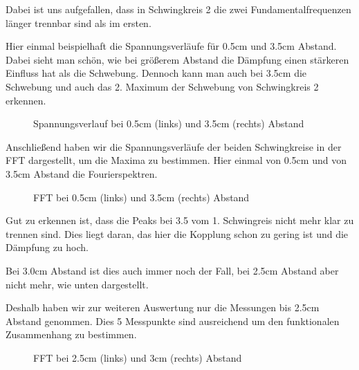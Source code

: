 \documentclass[twoside]{protokoll}
\begin{document}
Dabei ist uns aufgefallen, dass in Schwingkreis 2 die zwei Fundamentalfrequenzen länger trennbar sind als im ersten.  

Hier einmal beispielhaft die Spannungsverläufe für 0.5cm und 3.5cm Abstand.
Dabei sieht man schön, wie bei größerem Abstand die Dämpfung einen stärkeren Einfluss hat als die Schwebung.
Dennoch kann man auch bei 3.5cm die Schwebung und auch das 2. Maximum der Schwebung von Schwingkreis 2 erkennen.
\begin{figure}[H]
    \centering
    \caption{Spannungsverlauf bei 0.5cm (links) und 3.5cm (rechts) Abstand}
\end{figure}

Anschließend haben wir die Spannungsverläufe der beiden Schwingkreise in der FFT dargestellt, um die Maxima zu bestimmen.
Hier einmal von 0.5cm und von 3.5cm Abstand die Fourierspektren.
\begin{figure}[H]
    \centering
    \caption{FFT bei 0.5cm (links) und 3.5cm (rechts) Abstand}
\end{figure}

Gut zu erkennen ist, dass die Peaks bei 3.5 vom 1. Schwingreis nicht mehr klar zu trennen sind.
Dies liegt daran, das hier die Kopplung schon zu gering ist und die Dämpfung zu hoch.

Bei 3.0cm Abstand ist dies auch immer noch der Fall, bei 2.5cm Abstand aber nicht mehr, wie unten dargestellt.

Deshalb haben wir zur weiteren Auswertung nur die Messungen bis 2.5cm Abstand genommen.
Dies 5 Messpunkte sind ausreichend um den funktionalen Zusammenhang zu bestimmen.
\begin{figure}[H]
    \centering
    \caption{FFT bei 2.5cm (links) und 3cm (rechts) Abstand}
\end{figure}
 
\end{document}
